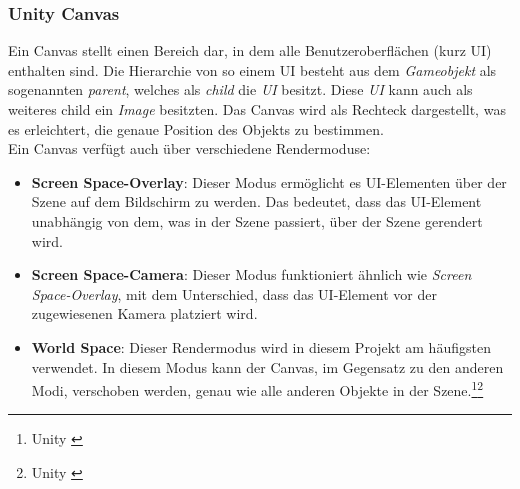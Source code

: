 \subsubsection{Unity Canvas}
Ein Canvas stellt einen Bereich dar, in dem alle Benutzeroberflächen (kurz UI) enthalten sind. Die Hierarchie von so einem UI besteht aus dem \textit{Gameobjekt} als sogenannten \textit{parent}, welches als \textit{child} die \textit{UI} besitzt. Diese \textit{UI} kann auch als weiteres child ein \textit{Image} besitzten. Das Canvas wird als Rechteck dargestellt, was es erleichtert, die genaue Position des Objekts zu bestimmen.\\
Ein Canvas verfügt auch über verschiedene Rendermoduse:
\begin{itemize}

    \item\textbf{Screen Space-Overlay}: Dieser Modus ermöglicht es UI-Elementen über der Szene auf dem Bildschirm zu werden. Das bedeutet, dass das UI-Element unabhängig von dem, was in der Szene passiert, über der Szene gerendert wird.

    \item\textbf{Screen Space-Camera}: Dieser Modus funktioniert ähnlich wie \textit{Screen Space-Overlay}, mit dem Unterschied, dass das UI-Element vor der zugewiesenen Kamera platziert wird.

    \item\textbf{World Space}: Dieser Rendermodus wird in diesem Projekt am häufigsten verwendet. In diesem Modus kann der Canvas, im Gegensatz zu den anderen Modi, verschoben werden, genau wie alle anderen Objekte in der Szene.\protect\footnote{Unity \cite{Canvas}}\protect\footnote{Unity \cite{Renderer}}
\end{itemize}

